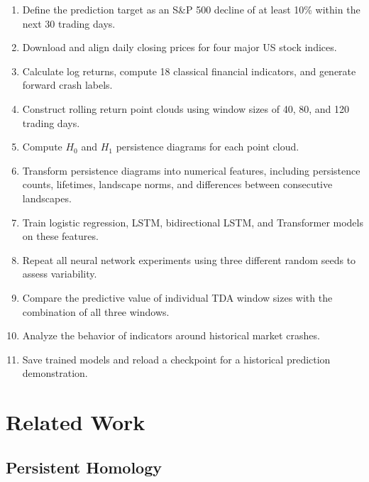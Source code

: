 \documentclass[oneside,english,11pt]{article}
\begin{document}
\begin{enumerate}[leftmargin=*]

\item Define the prediction target as an S\&P 500 decline of at least 10\% within the next 30 trading days.

\item Download and align daily closing prices for four major US stock indices.

\item Calculate log returns, compute 18 classical financial indicators, and generate forward crash labels.

\item Construct rolling return point clouds using window sizes of 40, 80, and 120 trading days.

\item Compute $H_0$ and $H_1$ persistence diagrams for each point cloud.

\item Transform persistence diagrams into numerical features, including persistence counts, lifetimes, landscape norms, and differences between consecutive landscapes.

\item Train logistic regression, LSTM, bidirectional LSTM, and Transformer models on these features.

\item Repeat all neural network experiments using three different random seeds to assess variability.

\item Compare the predictive value of individual TDA window sizes with the combination of all three windows.

\item Analyze the behavior of indicators around historical market crashes.

\item Save trained models and reload a checkpoint for a historical prediction demonstration.

\end{enumerate}



\section{Related Work}

\label{sec:related}

\subsection{Persistent Homology}
\end{document}
